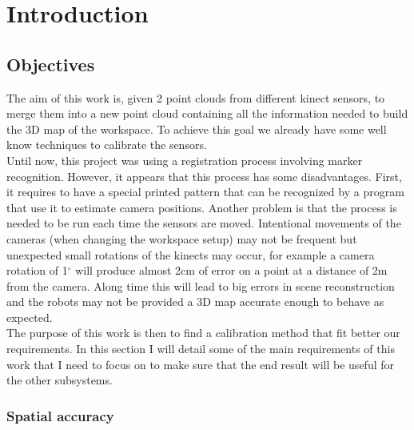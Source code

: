 
\chapter{Introduction}

\section{Objectives}

The aim of this work is, given 2 point clouds from different kinect sensors, to merge them into a new point cloud containing all the information needed to build the 3D map of the workspace. To achieve this goal we already have some well know techniques to calibrate the sensors. \\
Until now, this project was using a registration process involving marker recognition. However, it appears that this process has some disadvantages. First, it requires to have a special printed pattern that can be recognized by a program that use it to estimate camera positions. Another problem is that the process is needed to be run each time the sensors are moved. Intentional movements of the cameras (when changing the workspace setup) may not be frequent but unexpected small rotations of the kinects may occur, for example a camera rotation of 1$^\circ$ will produce almost 2cm of error on a point at a distance of 2m from the camera. Along time this will lead to big errors in scene reconstruction and the robots may not be provided a 3D map accurate enough to behave as expected. \\
The purpose of this work is then to find a calibration method that fit better our requirements. In this section I will detail some of the main requirements of this work that I need to focus on to make sure that the end result will be useful for the other subsystems.

\subsection{Spatial accuracy}

